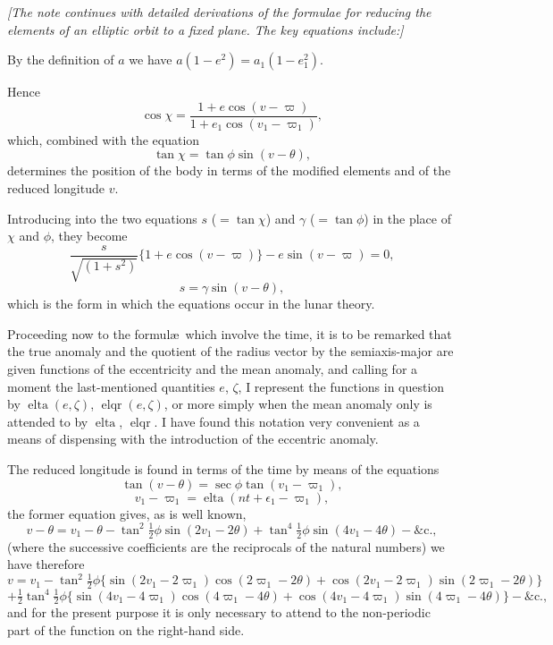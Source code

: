 \documentclass[11pt,a4paper]{book}
\begin{document}
\newpage
[180]

\textit{[The note continues with detailed derivations of the formulae for reducing the elements of an elliptic orbit to a fixed plane. The key equations include:]}

By the definition of $a$ we have $a(1 - e^2) = a_1(1 - e_1^2)$.

Hence
\[
\cos \chi = \frac{1 + e \cos(v - \varpi)}{1 + e_1 \cos(v_1 - \varpi_1)},
\]
which, combined with the equation
\[
\tan \chi = \tan \phi \sin(v - \theta),
\]
determines the position of the body in terms of the modified elements and of the reduced longitude $v$.

Introducing into the two equations $s$ ($= \tan \chi$) and $\gamma$ ($= \tan \phi$) in the place of $\chi$ and $\phi$, they become
\[
\frac{s}{\sqrt{(1 + s^2)}} \{1 + e \cos(v - \varpi)\} - e \sin(v - \varpi) = 0,
\]
\[
s = \gamma \sin(v - \theta),
\]
which is the form in which the equations occur in the lunar theory.

Proceeding now to the formul\ae\ which involve the time, it is to be remarked that the true anomaly and the quotient of the radius vector by the semiaxis-major are given functions of the eccentricity and the mean anomaly, and calling for a moment the last-mentioned quantities $e$, $\zeta$, I represent the functions in question by $\operatorname{elta}(e, \zeta)$, $\operatorname{elqr}(e, \zeta)$, or more simply when the mean anomaly only is attended to by $\operatorname{elta}$, $\operatorname{elqr}$. I have found this notation very convenient as a means of dispensing with the introduction of the eccentric anomaly.

The reduced longitude is found in terms of the time by means of the equations
\[
\tan(v - \theta) = \sec \phi \tan(v_1 - \varpi_1),
\]
\[
v_1 - \varpi_1 = \operatorname{elta}(nt + \epsilon_1 - \varpi_1),
\]
the former equation gives, as is well known,
\[
v - \theta = v_1 - \theta - \tan^2 \tfrac{1}{2}\phi \sin(2v_1 - 2\theta) + \tan^4 \tfrac{1}{2}\phi \sin(4v_1 - 4\theta) - \&\text{c.},
\]
(where the successive coefficients are the reciprocals of the natural numbers) we have therefore
\[
v = v_1 - \tan^2 \tfrac{1}{2}\phi \{\sin(2v_1 - 2\varpi_1)\cos(2\varpi_1 - 2\theta) + \cos(2v_1 - 2\varpi_1)\sin(2\varpi_1 - 2\theta)\}
\]
\[
+ \tfrac{1}{2} \tan^4 \tfrac{1}{2}\phi \{\sin(4v_1 - 4\varpi_1)\cos(4\varpi_1 - 4\theta) + \cos(4v_1 - 4\varpi_1)\sin(4\varpi_1 - 4\theta)\} - \&\text{c.},
\]
and for the present purpose it is only necessary to attend to the non-periodic part of the function on the right-hand side.
\end{document}
